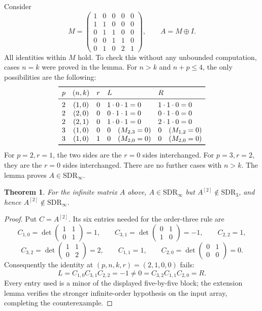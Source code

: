 \documentclass[10pt]{article}
\newtheorem{theorem}{Theorem}
\newcommand{\SDR}{\mathrm{SDR}}
\begin{document}
Consider
\[
 M=\begin{pmatrix}
 1&0&0&0&0\\1&1&0&0&0\\0&1&1&0&0\\0&0&1&1&0\\0&1&0&2&1
 \end{pmatrix},\qquad A=M\oplus I.
\]
All identities within \(M\) hold. To check this without any unbounded
computation, cases \(n=k\) were proved in the lemma. For \(n>k\)
and \(n+p\le4\), the only possibilities are the following:
\[
\begin{array}{cccll}
\toprule
p&(n,k)&r&L&R\\
\midrule
2&(1,0)&0&1\cdot0\cdot1=0&1\cdot1\cdot0=0\\
2&(2,0)&0&0\cdot1\cdot1=0&0\cdot1\cdot0=0\\
2&(2,1)&0&1\cdot0\cdot1=0&2\cdot1\cdot0=0\\
3&(1,0)&0&0\quad(M_{2,3}=0)&0\quad(M_{1,2}=0)\\
3&(1,0)&1&0\quad(M_{2,0}=0)&0\quad(M_{2,0}=0)\\
\bottomrule
\end{array}
\]
For \(p=2,r=1\), the two sides are the \(r=0\) sides interchanged.
For \(p=3,r=2\), they are the \(r=0\) sides interchanged.
There are no further cases with \(n>k\). The lemma proves
\(A\in\SDR_\infty\).

\begin{theorem}
For the infinite matrix \(A\) above, \(A\in\SDR_\infty\) but
\(A^{[2]}\notin\SDR_3\), and hence \(A^{[2]}\notin\SDR_\infty\).
\end{theorem}
\begin{proof}
Put \(C=A^{[2]}\). Its six entries needed for the order-three rule are
\[
 C_{1,0}=\det\begin{pmatrix}1&1\\0&1\end{pmatrix}=1,\qquad
 C_{3,1}=\det\begin{pmatrix}0&1\\1&0\end{pmatrix}=-1,\qquad
 C_{2,2}=1,
\]
\[
 C_{3,2}=\det\begin{pmatrix}1&1\\0&2\end{pmatrix}=2,\qquad
 C_{1,1}=1,\qquad
 C_{2,0}=\det\begin{pmatrix}0&1\\0&0\end{pmatrix}=0.
\]
Consequently the identity at \((p,n,k,r)=(2,1,0,0)\) fails:
\[
 L=C_{1,0}C_{3,1}C_{2,2}=-1
 \ne 0=C_{3,2}C_{1,1}C_{2,0}=R.
\]
Every entry used is a minor of the displayed five-by-five block;
the extension lemma verifies the stronger infinite-order hypothesis
on the input array, completing the counterexample.
\end{proof}
\end{document}
